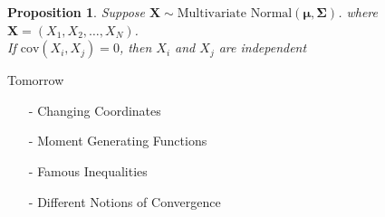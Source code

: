 \documentclass{beamer}
\newtheorem{prop}{Proposition}
\numberwithin{equation}{section}
\begin{document}
\begin{frame}

\begin{prop}
Suppose $\boldsymbol{X} \sim \text{Multivariate Normal}(\boldsymbol{\mu}, \boldsymbol{\Sigma})$.  
where $\boldsymbol{X}= (X_{1}, X_{2}, \hdots, X_{N})$. \\
If $\text{cov}(X_{i}, X_{j})  = 0  $, then $X_{i}$ and $X_{j}$ are independent 

\end{prop}



\end{frame}



\begin{frame}

Tomorrow
\begin{itemize}
\item[-] Changing Coordinates
\item[-] Moment Generating Functions
\item[-] Famous Inequalities
\item[-] Different Notions of Convergence
\end{itemize}
\end{frame}
\end{document}
